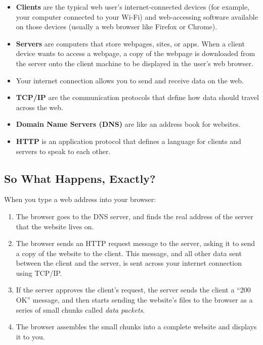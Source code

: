 \documentclass[]{book}
\providecommand{\tightlist}{%
  \setlength{\itemsep}{0pt}\setlength{\parskip}{0pt}}
\begin{document}
\begin{itemize}
\tightlist
\item
  \textbf{Clients} are the typical web user's internet-connected devices
  (for example, your computer connected to your Wi-Fi) and web-accessing
  software available on those devices (usually a web browser like
  Firefox or Chrome).
\item
  \textbf{Servers} are computers that store webpages, sites, or apps.
  When a client device wants to access a webpage, a copy of the webpage
  is downloaded from the server onto the client machine to be displayed
  in the user's web browser.
\item
  Your internet connection allows you to send and receive data on the
  web.
\item
  \textbf{TCP/IP} are the communication protocols that define how data
  should travel across the web.
\item
  \textbf{Domain Name Servers (DNS)} are like an address book for
  websites.
\item
  \textbf{HTTP} is an application protocol that defines a language for
  clients and servers to speak to each other.
\end{itemize}

\subsection{So What Happens, Exactly?}\label{so-what-happens-exactly}

When you type a web address into your browser:

\begin{enumerate}
\def\labelenumi{\arabic{enumi}.}
\tightlist
\item
  The browser goes to the DNS server, and finds the real address of the
  server that the website lives on.
\item
  The browser sends an HTTP request message to the server, asking it to
  send a copy of the website to the client. This message, and all other
  data sent between the client and the server, is sent across your
  internet connection using TCP/IP.
\item
  If the server approves the client's request, the server sends the
  client a ``200 OK'' message, and then starts sending the website's
  files to the browser as a series of small chunks called \emph{data
  packets}.
\item
  The browser assembles the small chunks into a complete website and
  displays it to you.
\end{enumerate}
\end{document}
